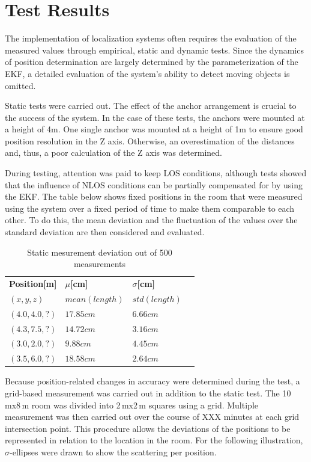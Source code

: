 \documentclass[conference, a4paper]{IEEEtran}
\begin{document}
\section{Test Results}\label{section:tests}
The implementation of localization systems often requires the evaluation of the measured values through empirical,
static and dynamic tests.
Since the dynamics of position determination are largely determined by the parameterization of the \ac{EKF},
a detailed evaluation of the system's ability to detect moving objects is omitted.

Static tests were carried out.
The effect of the anchor arrangement is crucial to the success of the system.
In the case of these tests, the anchors were mounted at a height of 4m.
One single anchor was mounted at a height of 1m to ensure good position resolution in the Z axis.
Otherwise, an overestimation of the distances and, thus, a poor calculation of the Z axis was determined.

During testing, attention was paid to keep \ac{LOS} conditions,
although tests showed that the influence of \ac{NLOS} conditions can be partially compensated for by using the \ac{EKF}.
The table below shows fixed positions in the room that were measured using the system
over a fixed period of time to make them comparable to each other.
To do this, the mean deviation and the fluctuation of the values over the standard deviation are then considered and evaluated.

\begin{table}[hbt!]
	\centering
	\begin{tabular}{l l l c}
		\textbf{Position[m]} & \textbf{$\mu$[cm]} & \textbf{$\sigma$[cm]}\\
		$(x,y,z)$ & $mean(length)$ & $std(length)$\\
		$(4.0,4.0,?)$ & $17.85cm$ & $6.66cm$\\
		$(4.3,7.5,?)$ & $14.72cm$ & $3.16cm$\\
		$(3.0,2.0,?)$ & $9.88cm$ & $4.45cm$\\
		$(3.5,6.0,?)$ & $18.58cm$ & $2.64cm$\\
	\end{tabular}
	\caption{Static mesurement deviation out of 500 measurements}
\end{table}

Because position-related changes in accuracy were determined during the test,
a grid-based measurement was carried out in addition to the static test.
The 10\,mx8\,m room was divided into 2\,mx2\,m squares using a grid.
Multiple measurement was then carried out over the course of XXX minutes at each grid intersection point.
This procedure allows the deviations of the positions to be represented in relation to the location in the room.
For the following illustration, $\sigma$-ellipses were drawn to show the scattering per position.
\end{document}
